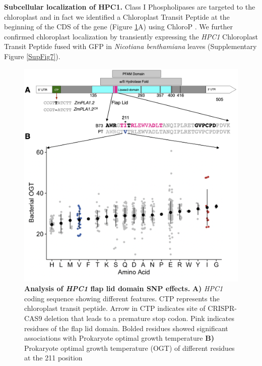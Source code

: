 \documentclass[9pt,twocolumn,twoside,lineno]{BioRxiv}
\begin{document}
\textbf{Subcellular localization of HPC1.} Class I Phospholipases are targeted to the chloroplast and in fact we identified a Chloroplast Transit Peptide at the beginning of the CDS of the gene (Figure \ref{Fig5}A) using ChloroP \cite{Emanuelsson1999-rs}.
We further confirmed chloroplast localization by transiently expressing  the \textit{HPC1} Chloroplast Transit Peptide fused with GFP in \textit{Nicotiana benthamiana} leaves (Supplementary Figure \ref{SupFig7}).


\begin{figure}[!ht]
\begin{center}
\includegraphics[width=0.4\paperwidth]{Figures/Fig_5.png}
\caption{\textbf{Analysis of \textit{HPC1} flap lid domain SNP effects.}  
\textbf{A)} \textit{HPC1} coding sequence showing different features. 
CTP represents the chloroplast transit peptide. 
Arrow in CTP indicates site of CRISPR-CAS9 deletion that leads to a premature stop codon.
Pink indicates residues of the flap lid domain.
Bolded residues showed significant associations with Prokaryote optimal growth temperature 
\textbf{B)} Prokaryote optimal growth temperature (OGT) of different residues at the 211 position}
\label{Fig5}
\end{center}
\end{figure}
\end{document}
